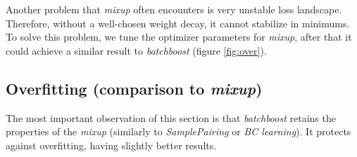\documentclass{article}
\begin{document}
Another problem that \emph{mixup} often encounters is very unstable loss
landscape. Therefore, without a well-chosen weight decay, it cannot stabilize in
minimums. To solve this problem, we tune the optimizer parameters
for \emph{mixup}, after that it could achieve a similar result to
\emph{batchboost} (figure \ref{fig:over}).

\subsection{Overfitting (comparison to \emph{mixup})}
\label{sec:over}

The most important observation of this section is that \emph{batchboost} retains
the properties of the \emph{mixup} (similarly to \emph{SamplePairing} or
\emph{BC learning}). It protects against overfitting, having slightly better results.
\end{document}
